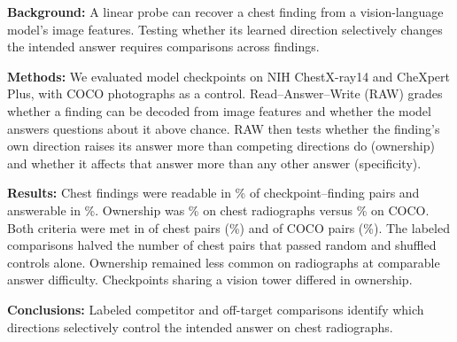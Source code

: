 \textbf{Background:} A linear probe can recover a chest finding from a vision-language model's image features. Testing whether its learned direction selectively changes the intended answer requires comparisons across findings.

\textbf{Methods:} We evaluated \cfCheckpoints{} model checkpoints on NIH ChestX-ray14 and CheXpert Plus, with COCO photographs as a control. Read--Answer--Write (RAW) grades whether a finding can be decoded from image features and whether the model answers questions about it above chance. RAW then tests whether the finding's own direction raises its answer more than competing directions do (ownership) and whether it affects that answer more than any other answer (specificity).

\textbf{Results:} Chest findings were readable in \cfChestReadablePct{}\% of checkpoint--finding pairs and answerable in \cfChestAnswerablePct{}\%. Ownership was \cfChestOwnedPct{}\% on chest radiographs versus \cfCocoOwnedPct{}\% on COCO. Both criteria were met in \jnTwoWayChest{} of \cfChestCellsN{} chest pairs (\jnTwoWayChestPct{}\%) and \jnTwoWayCoco{} of \cfCocoCells{} COCO pairs (\jnTwoWayCocoPct{}\%). The labeled comparisons halved the number of chest pairs that passed random and shuffled controls alone. Ownership remained less common on radiographs at comparable answer difficulty. Checkpoints sharing a vision tower differed in ownership.

\textbf{Conclusions:} Labeled competitor and off-target comparisons identify which directions selectively control the intended answer on chest radiographs.
